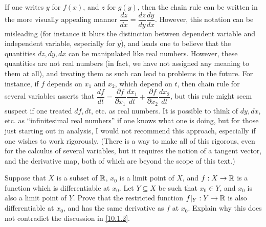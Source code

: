 \setcounter{thm}{16}
\begin{rmk}\label{10.1.17}
  If one writes \(y\) for \(f(x)\), and \(z\) for \(g(y)\), then the chain rule can be written in the more visually appealing manner \(\dfrac{dz}{dx} = \dfrac{dz}{dy} \dfrac{dy}{dx}\).
  However, this notation can be misleading (for instance it blurs the distinction between dependent variable and independent variable, especially for \(y\)), and leads one to believe that the quantities \(dz, dy, dx\) can be manipulated like real numbers.
  However, these quantities are not real numbers (in fact, we have not assigned any meaning to them at all), and treating them as such can lead to problems in the future.
  For instance, if \(f\) depends on \(x_1\) and \(x_2\), which depend on \(t\), then chain rule for several variables asserts that \(\dfrac{df}{dt} = \dfrac{\partial f}{\partial x_1} \dfrac{dx_1}{dt} + \dfrac{\partial f}{\partial x_2} \dfrac{dx_2}{dt}\), but this rule might seem suspect if one treated \(df, dt\), etc. as real numbers.
  It is possible to think of \(dy, dx\), etc. as ``infinitesimal real numbers'' if one knows what one is doing, but for those just starting out in analysis, I would not recommend this approach, especially if one wishes to work rigorously.
  (There is a way to make all of this rigorous, even for the calculus of several variables, but it requires the notion of a tangent vector, and the derivative map, both of which are beyond the scope of this text.)
\end{rmk}

\exercisesection

\begin{ex}\label{ex:10.1.1}
  Suppose that \(X\) is a subset of \(\mathbb{R}\), \(x_0\) is a limit point of \(X\), and \(f : X \to \mathbb{R}\) is a function which is differentiable at \(x_0\).
  Let \(Y \subseteq X\) be such that \(x_0 \in Y\), and \(x_0\) is also a limit point of \(Y\).
  Prove that the restricted function \(f|_Y : Y \to \mathbb{R}\) is also differentiable at \(x_0\), and has the same derivative as \(f\) at \(x_0\).
  Explain why this does not contradict the discussion in \cref{10.1.2}.
\end{ex}

